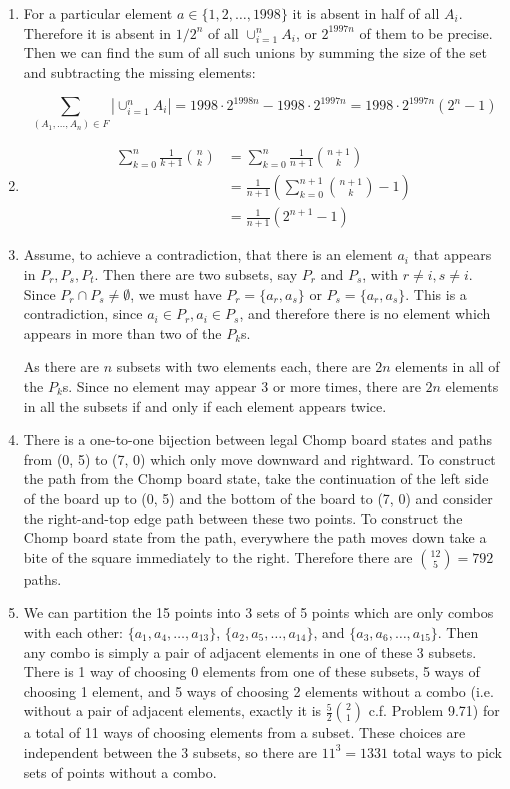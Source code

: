 \documentclass{book}
\numberwithin{equation}{section}
\begin{document}
\begin{enumerate}[label={9.\arabic*}]
\item
For a particular element $a \in \{1, 2, \ldots, 1998\}$ it is absent in half of all $A_i$. Therefore it is absent in $1/2^n$
of all $\cup_{i=1}^n A_i$, or $2^{1997n}$ of them to be precise. Then we can find the sum of all such unions by
summing the size of the set and subtracting the missing elements:

$$\sum_{(A_1, \ldots, A_n) \in F} |\cup_{i=1}^n A_i| = 1998\cdot 2^{1998n} - 1998 \cdot 2^{1997n} = 1998\cdot 2^{1997n}(2^n - 1)$$

\item
\begin{align*}
\sum_{k=0}^n \frac{1}{k+1}{n \choose k} & = \sum_{k=0}^n \frac{1}{n+1}{n+1 \choose k} \\
& = \frac{1}{n+1}\left( \sum_{k=0}^{n+1} {n+1 \choose k} - 1 \right) \\
& = \frac{1}{n+1}\left(2^{n+1} - 1\right)
\end{align*}

\item
Assume, to achieve a contradiction, that there is an element $a_i$ that appears in $P_r, P_s, P_t$. Then there are two
subsets, say $P_r$ and $P_s$, with $r \neq i, s \neq i$. Since $P_r \cap P_s \neq \emptyset$, we must have
$P_r = \{a_r, a_s\}$ or $P_s = \{a_r, a_s\}$. This is a contradiction, since $a_i \in P_r, a_i \in P_s$, and therefore there
is no element which appears in more than two of the $P_k$s.

As there are $n$ subsets with two elements each, there are $2n$ elements in all of the $P_k$s. Since no element
may appear 3 or more times, there are $2n$ elements in all the subsets if and only if each element appears twice.

\item
There is a one-to-one bijection between legal Chomp board states and paths from (0, 5) to (7, 0) which only move
downward and rightward. To construct the path from the Chomp board state, take the continuation of the left
side of the board up to (0, 5) and the bottom of the board to (7, 0) and consider the right-and-top edge path between
these two points. To construct the Chomp board state from the path, everywhere the path moves down take a bite
of the square immediately to the right. Therefore there are ${12 \choose 5} = 792$ paths.

\item
We can partition the 15 points into 3 sets of 5 points which are only combos with each other: $\{a_1, a_4, \ldots, a_{13}\}$,
$\{a_2, a_5, \ldots, a_{14}\}$, and $\{a_3, a_6, \ldots, a_{15}\}$. Then any combo is simply a pair of adjacent elements in one
of these 3 subsets. There is 1 way of choosing 0 elements from one of these subsets, 5 ways of choosing 1 element,
and 5 ways of choosing 2 elements without a combo (i.e. without a pair of adjacent elements, exactly it is
$\frac{5}{2}{2 \choose 1}$ c.f. Problem 9.71) for a total of 11 ways of choosing elements from a subset. These choices
are independent between the 3 subsets, so there are $11^3 = 1331$ total ways to pick sets of points without a combo.


\end{enumerate}
\end{document}
